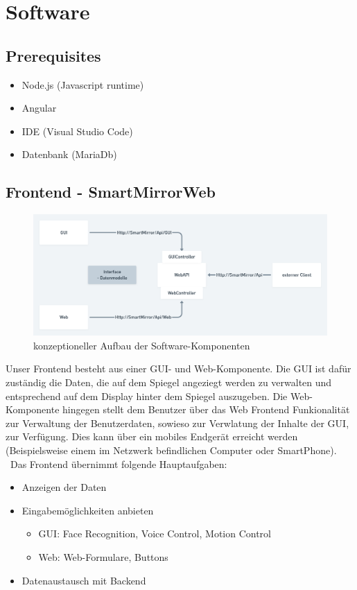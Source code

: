 \section{Software}\label{Software}
\subsection{Prerequisites}
\begin{itemize}
\item Node.js (Javascript runtime)
\item Angular
\item IDE (Visual Studio Code)
\item Datenbank (MariaDb)
\end{itemize}

\subsection{Frontend - SmartMirrorWeb}
\begin{figure}[h]
\centering
\includegraphics[width=120mm]{pictures/Frontend2.png}
\caption{konzeptioneller Aufbau der Software-Komponenten}
\end{figure}
Unser Frontend besteht aus einer GUI- und Web-Komponente. Die GUI ist dafür zuständig die Daten, die auf dem Spiegel angeziegt werden zu verwalten und entsprechend auf dem Display hinter dem Spiegel auszugeben. Die Web-Komponente hingegen stellt dem Benutzer über das Web Frontend Funkionalität zur Verwaltung der Benutzerdaten, sowieso zur Verwlatung der Inhalte der GUI, zur Verfügung. Dies kann über ein mobiles Endgerät erreicht werden (Beispielsweise einem im Netzwerk befindlichen Computer oder SmartPhone).\\\
Das Frontend übernimmt folgende Hauptaufgaben:
\begin{itemize}
\item Anzeigen der Daten
\item Eingabemöglichkeiten anbieten
\begin{itemize}
\item GUI: Face Recognition, Voice Control, Motion Control
\item Web: Web-Formulare, Buttons
\end{itemize}
\item Datenaustausch mit Backend
\end{itemize}



